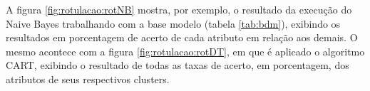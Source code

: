 

A figura \ref{fig:rotulacao:rotNB} mostra, por exemplo, o resultado da execução do Naive Bayes trabalhando com a base modelo (tabela \ref{tab:bdm}), exibindo os resultados em porcentagem de acerto de cada atributo em relação aos demais. O mesmo acontece com a figura \ref{fig:rotulacao:rotDT}, em que é aplicado o algoritmo  CART, exibindo o resultado de todas as taxas de acerto, em porcentagem, dos atributos de seus respectivos clusters. 




